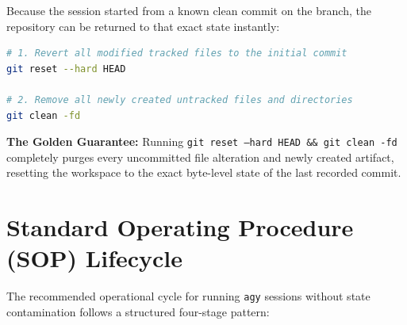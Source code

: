 \documentclass[11pt,letterpaper]{article}
\begin{document}
Because the session started from a known clean commit on the branch, the repository can be returned to that exact state instantly:

\begin{lstlisting}[language=bash]
# 1. Revert all modified tracked files to the initial commit
git reset --hard HEAD

# 2. Remove all newly created untracked files and directories
git clean -fd
\end{lstlisting}

\begin{recoverybox}
\textbf{The Golden Guarantee:} Running \texttt{git reset --hard HEAD \&\& git clean -fd} completely purges every uncommitted file alteration and newly created artifact, resetting the workspace to the exact byte-level state of the last recorded commit.
\end{recoverybox}

\section{Standard Operating Procedure (SOP) Lifecycle}

The recommended operational cycle for running \texttt{agy} sessions without state contamination follows a structured four-stage pattern:
\end{document}
